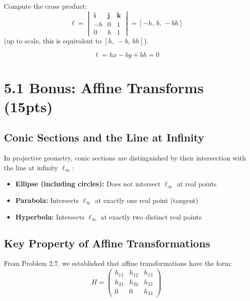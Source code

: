 \documentclass[12pt]{article}
\begin{document}
    Compute the cross product:
    \[
    \ell = 
    \begin{vmatrix}
    \mathbf{i} & \mathbf{j} & \mathbf{k} \\
    -b & 0 & 1 \\
    0 & h & 1
    \end{vmatrix}
    = [-h,\, b,\, -bh]
    \]
    (up to scale, this is equivalent to $[h,\ -b,\ bh]$).

    \[
        \ell = h x - b y + b h  = 0
    \]

\section*{5.1 Bonus: Affine Transforms (15pts)}


\subsection*{Conic Sections and the Line at Infinity}

In projective geometry, conic sections are distinguished by their intersection with the line at infinity $\ell_\infty$:


\begin{itemize}
    \item \textbf{Ellipse (including circles):} Does not intersect $\ell_\infty$ at real points
    \item \textbf{Parabola:} Intersects $\ell_\infty$ at exactly one real point (tangent)
    \item \textbf{Hyperbola:} Intersects $\ell_\infty$ at exactly two distinct real points
\end{itemize}

\subsection*{Key Property of Affine Transformations}

From Problem 2.7, we established that affine transformations have the form:
\[
H = \begin{pmatrix}
h_{11} & h_{12} & h_{13} \\
h_{21} & h_{22} & h_{23} \\
0 & 0 & h_{33}
\end{pmatrix}
\]
\end{document}
